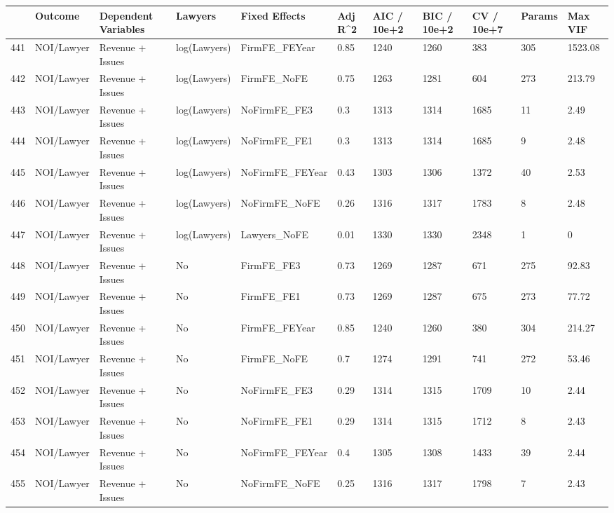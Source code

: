 \documentclass{article}
\begin{document}
\begin{table}[H]
\centering
\begin{tabular}{rllllllllll}
  \hline
 & Outcome & Dependent Variables & Lawyers & Fixed Effects & Adj R^2 & AIC / 10e+2 & BIC / 10e+2 & CV / 10e+7 & Params & Max VIF \\ 
  \hline
441 & NOI/Lawyer & Revenue + Issues & log(Lawyers) & FirmFE\_FEYear & 0.85 & 1240 & 1260 & 383 & 305 & 1523.08 \\ 
  442 & NOI/Lawyer & Revenue + Issues & log(Lawyers) & FirmFE\_NoFE & 0.75 & 1263 & 1281 & 604 & 273 & 213.79 \\ 
  443 & NOI/Lawyer & Revenue + Issues & log(Lawyers) & NoFirmFE\_FE3 & 0.3 & 1313 & 1314 & 1685 & 11 & 2.49 \\ 
  444 & NOI/Lawyer & Revenue + Issues & log(Lawyers) & NoFirmFE\_FE1 & 0.3 & 1313 & 1314 & 1685 & 9 & 2.48 \\ 
  445 & NOI/Lawyer & Revenue + Issues & log(Lawyers) & NoFirmFE\_FEYear & 0.43 & 1303 & 1306 & 1372 & 40 & 2.53 \\ 
  446 & NOI/Lawyer & Revenue + Issues & log(Lawyers) & NoFirmFE\_NoFE & 0.26 & 1316 & 1317 & 1783 & 8 & 2.48 \\ 
  447 & NOI/Lawyer & Revenue + Issues & log(Lawyers) & Lawyers\_NoFE & 0.01 & 1330 & 1330 & 2348 & 1 & 0 \\ 
  448 & NOI/Lawyer & Revenue + Issues & No & FirmFE\_FE3 & 0.73 & 1269 & 1287 & 671 & 275 & 92.83 \\ 
  449 & NOI/Lawyer & Revenue + Issues & No & FirmFE\_FE1 & 0.73 & 1269 & 1287 & 675 & 273 & 77.72 \\ 
  450 & NOI/Lawyer & Revenue + Issues & No & FirmFE\_FEYear & 0.85 & 1240 & 1260 & 380 & 304 & 214.27 \\ 
  451 & NOI/Lawyer & Revenue + Issues & No & FirmFE\_NoFE & 0.7 & 1274 & 1291 & 741 & 272 & 53.46 \\ 
  452 & NOI/Lawyer & Revenue + Issues & No & NoFirmFE\_FE3 & 0.29 & 1314 & 1315 & 1709 & 10 & 2.44 \\ 
  453 & NOI/Lawyer & Revenue + Issues & No & NoFirmFE\_FE1 & 0.29 & 1314 & 1315 & 1712 & 8 & 2.43 \\ 
  454 & NOI/Lawyer & Revenue + Issues & No & NoFirmFE\_FEYear & 0.4 & 1305 & 1308 & 1433 & 39 & 2.44 \\ 
  455 & NOI/Lawyer & Revenue + Issues & No & NoFirmFE\_NoFE & 0.25 & 1316 & 1317 & 1798 & 7 & 2.43 \\ 

\end{tabular}
\end{table}
\end{document}
